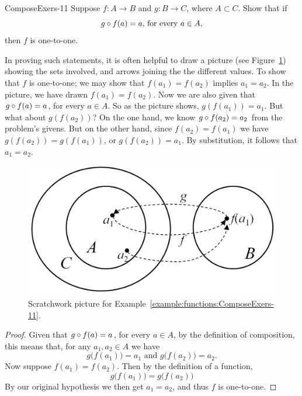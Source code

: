 \begin{example}{ComposeExers-11}
Suppose $f\colon A \to B$ and $g \colon B \to C$, where $A \subset C$. Show that if 
$$\mbox{$g \circ f(a) = a$, for every $a \in A$,} $$
 then $f$ is one-to-one.
 
\begin{scratchwork}
In proving such statements, it is often helpful to draw a picture (see Figure~\ref{compose1}) showing the sets involved, and arrows joining the the different values. 
To show that $f$ is one-to-one; we may show that $f(a_1) = f(a_2)$ implies $a_1 = a_2$.  In the picture, we have drawn $f(a_1) = f(a_2)$. Now we are also given that $g \circ f(a) = a$, for every $a \in A$. So as the picture shows, $g(f(a_1)) = a_1$. But what about $g(f(a_2))$?  On the one hand, we know $g \circ f(a_2) = a_2$ from the problem's givens.  But on the other hand, since $f(a_2)=f(a_1)$ we have $g(f(a_2)) = g(f(a_1))$, or $g(f(a_2)) = a_1$. By substitution, it follows that $a_1=a_2$.
\end{scratchwork}

 \begin{figure}[h]
\includegraphics[width=4.5in]{images/compose1.png}
\caption{Scratchwork picture for Example~\ref{example:functions:ComposeExers-11}.}
\label{compose1}
\end{figure}

 \begin{proof}
Given that $g \circ f(a) = a$, for every $a \in A$, by the definition of composition, this means
that, for any $a_1, a_2 \in A$ we have
$$ g \bigl( f(a_1) \bigr) = a_1 \mbox{ and }  g \bigl( f(a_2) \bigr) = a_2.$$
Now suppose $f(a_1) = f(a_2)$. Then by the definition of a function, 
$$ g \bigl( f(a_1) \bigr) =  g \bigl( f(a_2) \bigr)$$
By our original hypothesis we then get $a_1 = a_2$, and thus $f$ is one-to-one.
\end{proof}    
 \end{example}

